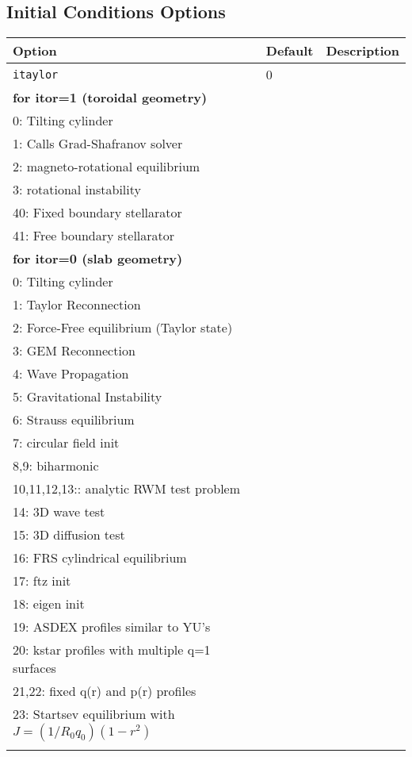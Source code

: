\subsection{Initial Conditions Options}

\begin{tabular}{llp{4in}}
  \textbf{Option}&\textbf{Default}&\textbf{Description}\\
  \hline
  \texttt{itaylor} & 0 & \begin{minipage}[t]{2.5in}
    Pre-defined initial conditions.\\
 {\bf for itor=1 (toroidal geometry)} \\ 
    0: Tilting cylinder \\
    1: Calls Grad-Shafranov solver \\
    2: magneto-rotational equilibrium \\
    3: rotational instability \\   
    40: Fixed boundary stellarator \\
    41: Free boundary stellarator \\
 {\bf for itor=0 (slab geometry) } \\
    0: Tilting cylinder\\
    1: Taylor Reconnection\\
    2: Force-Free equilibrium (Taylor state) \\
    3: GEM Reconnection\\
    4: Wave Propagation\\
    5: Gravitational Instability\\
    6: Strauss equilibrium \\
    7: circular field init \\
    8,9:  biharmonic \\
    10,11,12,13:: analytic RWM test problem \\
    14: 3D wave test \\
    15: 3D diffusion test \\
    16:  FRS cylindrical equilibrium \\
    17:  ftz init \\
    18:  eigen init \\
    19:  ASDEX profiles similar to YU's \\
    20: kstar profiles with multiple q=1 surfaces \\
    21,22: fixed q(r) and p(r) profiles \\
    23:  Startsev equilibrium with $ J = (1/R_0q_0)(1 - r^2)$ \\

\end{minipage}
\end{tabular}
